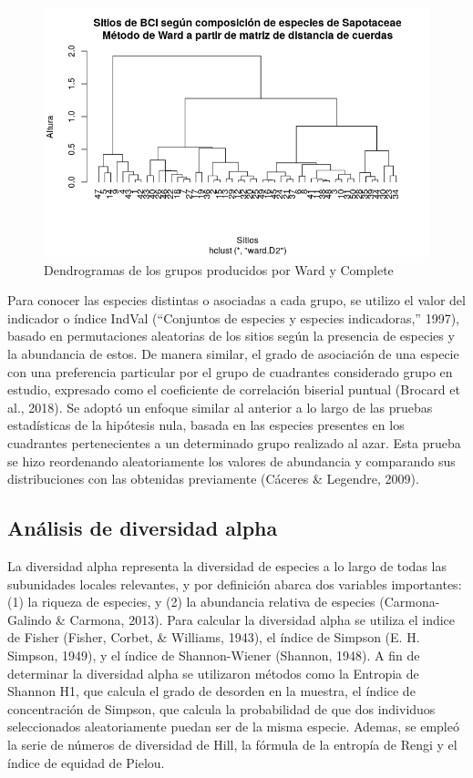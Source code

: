\documentclass[11pt,]{article}
\begin{document}
\begin{figure}
\centering
\includegraphics[width=1.00000\textwidth]{Dendograma.png}
\caption{Dendrogramas de los grupos producidos por Ward y Complete
\label{fig:Dendograma}}
\end{figure}

Para conocer las especies distintas o asociadas a cada grupo, se utilizo
el valor del indicador o índice IndVal (``Conjuntos de especies y
especies indicadoras,'' 1997), basado en permutaciones aleatorias de los
sitios según la presencia de especies y la abundancia de estos. De
manera similar, el grado de asociación de una especie con una
preferencia particular por el grupo de cuadrantes considerado grupo en
estudio, expresado como el coeficiente de correlación biserial puntual
(Brocard et al., 2018). Se adoptó un enfoque similar al anterior a lo
largo de las pruebas estadísticas de la hipótesis nula, basada en las
especies presentes en los cuadrantes pertenecientes a un determinado
grupo realizado al azar. Esta prueba se hizo reordenando aleatoriamente
los valores de abundancia y comparando sus distribuciones con las
obtenidas previamente (Cáceres \& Legendre, 2009).

\subsection{Análisis de diversidad
alpha}\label{anuxe1lisis-de-diversidad-alpha}

La diversidad alpha representa la diversidad de especies a lo largo de
todas las subunidades locales relevantes, y por definición abarca dos
variables importantes: (1) la riqueza de especies, y (2) la abundancia
relativa de especies (Carmona-Galindo \& Carmona, 2013). Para calcular
la diversidad alpha se utiliza el indice de Fisher (Fisher, Corbet, \&
Williams, 1943), el índice de Simpson (E. H. Simpson, 1949), y el índice
de Shannon-Wiener (Shannon, 1948). A fin de determinar la diversidad
alpha se utilizaron métodos como la Entropia de Shannon H1, que calcula
el grado de desorden en la muestra, el índice de concentración de
Simpson, que calcula la probabilidad de que dos individuos seleccionados
aleatoriamente puedan ser de la misma especie. Ademas, se empleó la
serie de números de diversidad de Hill, la fórmula de la entropía de
Rengi y el índice de equidad de Pielou.
\end{document}
